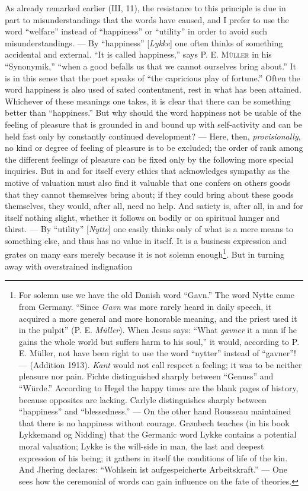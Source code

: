 \documentclass[12pt,a4paper,openany]{book}
\begin{document}
As already remarked earlier (III, 11), the resistance to this principle is due in part to
misunderstandings that the words have caused, and I prefer to use the word ``welfare'' instead of
``happiness'' or ``utility'' in order to avoid such misunderstandings. --- By ``happiness'' [\textit{Lykke}]
one often thinks of something accidental and external. ``It is called happiness,'' says P. E.
\textsc{Müller} in his ``Synonymik,'' ``when a good befalls us that we cannot ourselves bring about.'' It is
in this sense that the poet speaks of ``the capricious play of fortune.'' Often the word happiness is also
used of sated contentment, rest in what has been attained. Whichever of these meanings one takes, it is
clear that there can be something better than ``happiness.'' But why should the word happiness not be
usable of the feeling of pleasure that is grounded in and bound up with self-activity and can be held fast
only by constantly continued development? --- Here, then, \textit{provisionally}, no kind or degree of
feeling of pleasure is to be excluded; the order of rank among the different feelings of pleasure can be
fixed only by the following more special inquiries. But in and for itself every ethics that acknowledges
sympathy as the motive of valuation must also find it valuable that one confers on others goods that they
cannot themselves bring about; if they could bring about these goods themselves, they would, after all,
need no help. And satiety is, after all, in and for itself nothing slight, whether it follows on bodily
or on spiritual hunger and thirst. --- By ``utility'' [\textit{Nytte}] one easily thinks only of what is a
mere means to something else, and thus has no value in itself. It is a business expression and grates on
many ears merely because it is not solemn enough\footnote[1]{For solemn use we have the old Danish word
``Gavn.'' The word Nytte came from Germany. ``Since \textit{Gavn} was more rarely heard in daily speech, it
acquired a more general and more honorable meaning, and the priest used it in the pulpit'' (P. E.
\emph{Müller}). When Jesus says: ``What \textit{gavner} it a man if he gains the whole world but suffers
harm to his soul,'' it would, according to P. E. Müller, not have been right to use the word ``nytter''
instead of ``gavner''! --- (Addition 1913). \emph{Kant} would not call respect a feeling; it was to be
neither pleasure nor pain. Fichte distinguished sharply between ``Genuss'' and ``Würde.'' According to
Hegel the happy times are the blank pages of history, because opposites are lacking. Carlyle distinguishes
sharply between ``happiness'' and ``blessedness.'' --- On the other hand Rousseau maintained that there is
no happiness without courage. Grønbech teaches (in his book Lykkemand og Nidding) that the Germanic word
Lykke contains a potential moral valuation; Lykke is the will-side in man, the last and deepest expression
of his being; it gathers in itself the conditions of life of the kin. And Jhering declares: ``Wohlsein ist
aufgespeicherte Arbeitskraft.'' --- One sees how the ceremonial of words can gain influence on the fate of
theories.}. But in turning away with overstrained indignation
\end{document}
